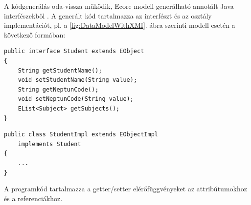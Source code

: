 %
A kódgenerálás oda-vissza működik, Ecore modell generálható annotált Java interfészekből \cite{MasteringEMF}.
A generált kód tartalmazza az interfészt és az osztály implementációt, pl. a \ref{fig:DataModelWithXMI}. ábra szerinti modell esetén a következő formában:
%
\begin{lstlisting}
public interface Student extends EObject
{
    String getStudentName();
    void setStudentName(String value);
    String getNeptunCode();
    void setNeptunCode(String value);
    EList<Subject> getSubjects();
}
\end{lstlisting}
\begin{lstlisting}
public class StudentImpl extends EObjectImpl
    implements Student
{
    ...
}
\end{lstlisting}
A programkód tartalmazza a getter/setter elérőfüggvényeket az attribútumokhoz és a referenciákhoz.

